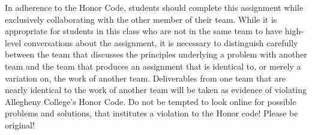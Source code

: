 \noindent In adherence to the Honor Code, students should complete this assignment while exclusively collaborating with the other member of their team. While it is appropriate for students in this class
who are not in the same team to have high-level conversations about the assignment, it is necessary to distinguish carefully between the team that discusses the principles underlying a problem with
another team and the team that produces an assignment that is identical to, or merely a variation
on, the work of another team. Deliverables from one team that are nearly identical to the work of
another team will be taken as evidence of violating Allegheny College's Honor Code. Do not be
tempted to look online for possible problems and solutions, that institutes a violation to the Honor
code! Please be original!


